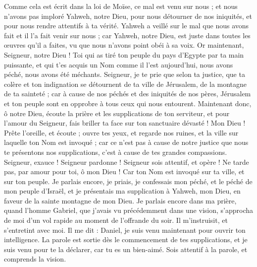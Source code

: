 \begin{multicols}{2}
Comme cela est écrit dans la loi de Moïse, ce mal est venu sur nous ; et nous n'avons pas imploré Yahweh, notre Dieu, pour nous détourner de nos iniquités, et pour nous rendre attentifs à ta vérité.
Yahweh a veillé sur le mal que nous avons fait et il l'a fait venir sur nous ; car Yahweh, notre Dieu, est juste dans toutes les œuvres qu'il a faites, vu que nous n'avons point obéi à sa voix.
Or maintenant, Seigneur, notre Dieu ! Toi qui as tiré ton peuple du pays d'Egypte par ta main puissante, et qui t'es acquis un Nom comme il l'est aujourd'hui, nous avons péché, nous avons été méchants.
Seigneur, je te prie que selon ta justice, que ta colère et ton indignation se détournent de ta ville de Jérusalem, de la montagne de ta sainteté ; car à cause de nos péchés et des iniquités de nos pères, Jérusalem et ton peuple sont en opprobre à tous ceux qui nous entourent.
Maintenant donc, ô notre Dieu, écoute la prière et les supplications de ton serviteur, et pour l'amour du Seigneur, fais briller ta face sur ton sanctuaire dévasté !
Mon Dieu ! Prête l'oreille, et écoute ; ouvre tes yeux, et regarde nos ruines, et la ville sur laquelle ton Nom est invoqué ; car ce n'est pas à cause de notre justice que nous te présentons nos supplications, c'est à cause de tes grandes compassions.
Seigneur, exauce ! Seigneur pardonne ! Seigneur sois attentif, et opère ! Ne tarde pas, par amour pour toi, ô mon Dieu ! Car ton Nom est invoqué sur ta ville, et sur ton peuple.
Je parlais encore, je priais, je confessais mon péché, et le péché de mon peuple d'Israël, et je présentais ma supplication à Yahweh, mon Dieu, en faveur de la sainte montagne de mon Dieu.
Je parlais encore dans ma prière, quand l'homme Gabriel, que j'avais vu précédemment dans une vision, s'approcha de moi d'un vol rapide au moment de l'offrande du soir.
Il m'instruisit, et s'entretint avec moi. Il me dit : Daniel, je suis venu maintenant pour ouvrir ton intelligence.
La parole est sortie dès le commencement de tes supplications, et je suis venu pour te la déclarer, car tu es un bien-aimé. Sois attentif à la parole, et comprends la vision.

\end{multicols}
